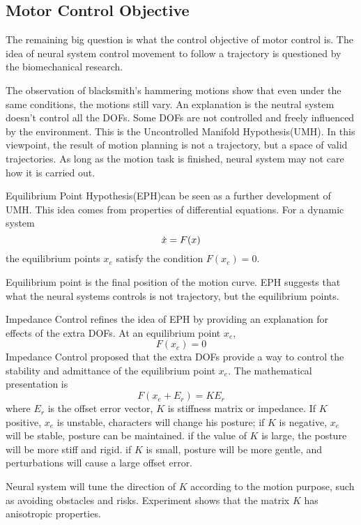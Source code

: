 \subsection{Motor Control Objective}
The remaining big question is what the control objective of motor control is.
The idea of neural system control movement to follow a trajectory is questioned by the biomechanical research.

The observation of blacksmith's hammering motions show that even under the same conditions, the motions still vary. 
An explanation is the neutral system doesn't control all the DOFs. 
Some DOFs are not controlled and freely influenced by the environment. 
This is the Uncontrolled Manifold Hypothesis(UMH)\citep{latash2008neurophysiological}. 
In this viewpoint, the result of motion planning is not a trajectory, but a space of valid trajectories. As long as the motion task is finished, neural system may not care how it is carried out.



Equilibrium Point Hypothesis(EPH)\citep{Feldman1986}can be seen as a further development of UMH. 
This idea comes from properties of differential equations. 
For a dynamic system
\[
\dot{x}=F(x)
\]
the equilibrium points $x_{e}$ satisfy the condition $F(x_{e})=0$.

Equilibrium point is the final position of the motion curve.
EPH suggests that what the neural systems controls is not trajectory, but the equilibrium points.



Impedance Control \citep{hogan1985ica} refines the idea of EPH by providing an explanation for effects of the extra DOFs. 
At an equilibrium point $x_{e}$,
\[
F(x_{e})=0 
\]
Impedance Control proposed that the extra DOFs provide a way to control the stability and admittance of the equilibrium point $x_{e}$. 
The mathematical presentation is
\begin{equation}
F(x_{e}+E_r)=KE_r
\end{equation}
where $E_r$ is the offset error vector, $K$ is stiffness matrix or impedance.
If $K$ positive, $x_{e}$ is unstable, characters will change his posture;
if $K$ is negative, $x_{e}$ will be stable, posture can be maintained.
if the value of $K$ is large, the posture will be more stiff and rigid.
if $K$ is small, posture will be more gentle, and perturbations will cause a large offset error.

Neural system will tune the direction of $K$ according to the motion purpose, such as avoiding obstacles and risks. 
Experiment \citep{Franklin2007} shows that the matrix $K$ has anisotropic properties.

